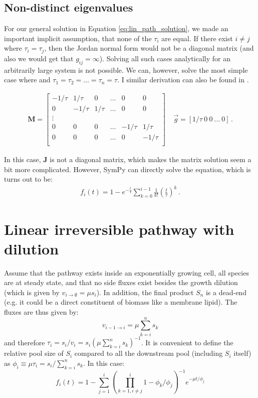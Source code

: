 \documentclass{article}
\newcommand{\flux}[2]{\ensuremath{v_{{#1} \rightarrow {#2}}}}
\begin{document}
\subsection{Non-distinct eigenvalues}\label{sec:equal_taus}
For our general solution in Equation \ref{eq:lin_path_solution}, we made an important implicit assumption, that none of the $\tau_i$ are equal. If there exist $i \neq j$ where $\tau_i = \tau_j$, then the Jordan normal form would not be a diagonal matrix (and also we would get that $g_{ij} = \infty$). Solving all such cases analytically for an arbitrarily large system is not possible. We can, however, solve the most simple case where and $\tau_1 = \tau_2 = \ldots = \tau_n = \tau$. I similar derivation can also be found in \cite{sokol_theoretical_2015}.

\begin{eqnarray}
\mathbf{M} =
\begin{bmatrix}
-1/\tau & 1/\tau & 0 & \ldots & 0 & 0\\
0 & -1/\tau & 1/\tau & \ldots & 0 & 0\\
\vdots\\
0 & 0 & 0 & \ldots & -1/\tau & 1/\tau\\
0 & 0 & 0 & \ldots & 0 & -1/\tau \\
\end{bmatrix}
~~~~~
\vec{g} = \left[1/\tau~0~0~\ldots~0\right]\,.
\end{eqnarray}

In this case, $\mathbf{J}$ is not a diagonal matrix, which makes the matrix solution seem a bit more complicated. However, SymPy can directly solve the equation, which is turns out to be:
\begin{eqnarray}\label{eq:equal_tau_solution}
    f_i(t) = 1 - e^{-\frac{t}{\tau}}\sum_{k=0}^{i-1} \frac{1}{k!}\left(\frac{t}{\tau}\right)^k\,.
\end{eqnarray}

\section{Linear irreversible pathway with dilution}\label{sec:linear_examples}
Assume that the pathway exists inside an exponentially growing cell, all species are at steady state, and that no side fluxes exist besides the growth dilution (which is given by $\flux{i}{\emptyset} = \mu s_i$). In addition, the final product $S_n$ is a dead-end (e.g. it could be a direct constituent of biomass like a membrane lipid). The fluxes are thus given by:
\begin{equation}
    \flux{i-1}{i} = \mu \sum_{k=i}^n s_k
\end{equation}
and therefore $\tau_i = s_i/v_i = s_i (\mu \sum_{k=i}^n s_k)^{-1}$. It is convenient to define the relative pool size of $S_i$ compared to all the downstream pool (including $S_i$ itself) as $\phi_i \equiv \mu\tau_i = s_i / \sum_{k=i}^n s_k$. In this case:
\begin{equation}\label{eq:dilution}
    f_i(t) = 1 - \sum_{j=1}^{i} \left(\prod_{k = 1, i \neq j}^{i} 1 - \phi_k/\phi_j\right)^{-1} e^{- \mu t / \phi_j}
\end{equation}
\end{document}
